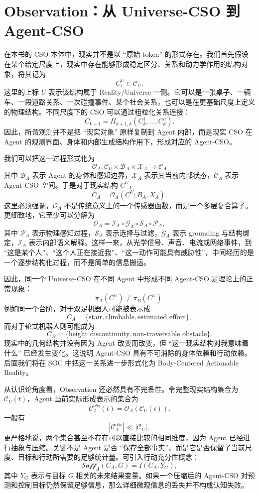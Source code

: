 \section{Observation：从 Universe-CSO 到 Agent-CSO}

在本书的 CSO 本体中，现实并不是以 ``原始 token'' 的形式存在。我们首先假设在某个给定尺度上，现实中存在能够形成稳定区分、关系和动力学作用的结构对象，将其记为
\[
C_i^U \in \mathcal{C}_U.
\]
这里的上标 $U$ 表示该结构属于 Reality/Universe 一侧。它可以是一张桌子、一辆车、一段道路关系、一次碰撞事件、某个社会关系，也可以是在更基础尺度上定义的物理结构。不同尺度下的 CSO 可以通过粗粒化关系连接：
\[
C_{k+1}
=
\Pi_{k+1,k}
\left(
C_k^1,\ldots,C_k^n
\right).
\]
因此，所谓观测并不是把 ``现实对象'' 原样复制到 Agent 内部，而是现实 CSO 在 Agent 的观测界面、身体和内部生成结构作用下，形成对应的 Agent-CSO。

我们可以把这一过程形式化为
\[
\boxed{
\mathcal{O}_A:
\mathcal{C}_U
\times
\mathcal{B}_A
\times
\mathcal{X}_A
\longrightarrow
\mathcal{C}_A
}
\]
其中 $\mathcal{B}_A$ 表示 Agent 的身体和感知边界，$\mathcal{X}_A$ 表示其当前内部状态，$\mathcal{C}_A$ 表示 Agent-CSO 空间。于是对于现实结构 $C^U$，
\[
C_A
=
\mathcal{O}_A
(C^U;B_A,X_A).
\]
这里必须强调，$\mathcal{O}_A$ 不是传统意义上的一个传感器函数，而是一个多层复合算子。更细致地，它至少可以分解为
\[
\mathcal{O}_A
=
\mathcal{I}_A
\circ
\mathcal{G}_A
\circ
\mathcal{S}_A
\circ
\mathcal{P}_A,
\]
其中 $\mathcal{P}_A$ 表示物理感知过程，$\mathcal{S}_A$ 表示选择与过滤，$\mathcal{G}_A$ 表示 grounding 与结构绑定，$\mathcal{I}_A$ 表示内部语义解释。这样一来，从光学信号、声音、电流或网络事件，到 ``这是某个人''、``这个人正在接近我''、``这一动作可能具有威胁性''，中间经历的是一个逐步结构化过程，而不是简单的信息搬运。

因此，同一个 Universe-CSO 在不同 Agent 中形成不同 Agent-CSO 是理论上的正常现象：
\[
\pi_A(C^U)
\neq
\pi_B(C^U).
\]
例如同一个台阶，对于双足机器人可能被表示成
\[
C_A
=
\{\text{stair},\text{climbable},\text{estimated effort}\},
\]
而对于轮式机器人则可能成为
\[
C_B
=
\{\text{height discontinuity},\text{non-traversable obstacle}\}.
\]
现实中的几何结构并没有因为 Agent 改变而改变，但 ``这一现实结构对我意味着什么'' 已经发生变化。这说明 Agent-CSO 具有不可消除的身体依赖和行动依赖。后面我们将在 SGC 中把这一关系进一步形式化为 Body-Centered Actionable Reality。

从认识论角度看，Observation 还必然具有不完备性。令完整现实结构集合为 $\mathcal{C}_U(t)$，Agent 当前实际形成表示的集合为
\[
\mathcal{C}_A^{obs}(t)
=
\mathcal{O}_A
\left(
\mathcal{C}_U(t)
\right).
\]
一般有
\[
\left|
\mathcal{C}_A^{obs}
\right|
\ll
\left|
\mathcal{C}_U
\right|,
\]
更严格地说，两个集合甚至不存在可以直接比较的相同维度，因为 Agent 已经进行抽象与压缩。关键不是 Agent 是否 ``保存全部事实''，而是它是否保留了当前尺度、目标和行动所需要的足够统计量。可引入行动充分性概念：
\[
\mathcal{Suff}_A(C_A,G)
=
I(C_A;Y_G),
\]
其中 $Y_G$ 表示与目标 $G$ 相关的未来结果变量。如果一个压缩后的 Agent-CSO 对预测和控制目标仍然保留足够信息，那么详细微观信息的丢失并不构成认知失败。

